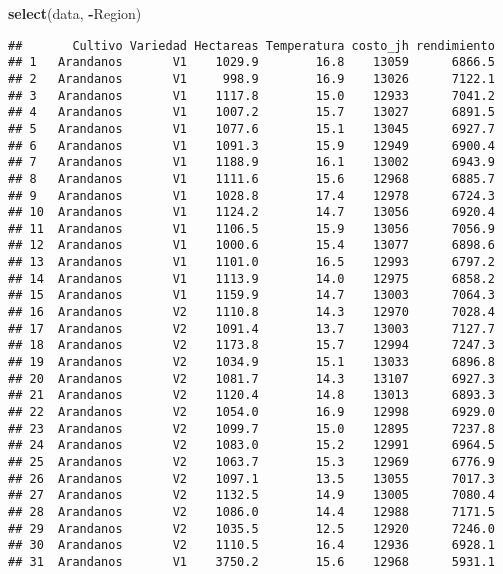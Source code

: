 \documentclass[]{book}
\newenvironment{Shaded}{\begin{snugshade}}{\end{snugshade}}
\newcommand{\KeywordTok}[1]{\textcolor[rgb]{0.13,0.29,0.53}{\textbf{#1}}}
\newcommand{\NormalTok}[1]{#1}
\newcommand{\OperatorTok}[1]{\textcolor[rgb]{0.81,0.36,0.00}{\textbf{#1}}}
\begin{document}
\begin{Shaded}
\begin{Highlighting}[]
\KeywordTok{select}\NormalTok{(data, }\OperatorTok{-}\NormalTok{Region)}
\end{Highlighting}
\end{Shaded}

\begin{verbatim}
##       Cultivo Variedad Hectareas Temperatura costo_jh rendimiento
## 1   Arandanos       V1    1029.9        16.8    13059      6866.5
## 2   Arandanos       V1     998.9        16.9    13026      7122.1
## 3   Arandanos       V1    1117.8        15.0    12933      7041.2
## 4   Arandanos       V1    1007.2        15.7    13027      6891.5
## 5   Arandanos       V1    1077.6        15.1    13045      6927.7
## 6   Arandanos       V1    1091.3        15.9    12949      6900.4
## 7   Arandanos       V1    1188.9        16.1    13002      6943.9
## 8   Arandanos       V1    1111.6        15.6    12968      6885.7
## 9   Arandanos       V1    1028.8        17.4    12978      6724.3
## 10  Arandanos       V1    1124.2        14.7    13056      6920.4
## 11  Arandanos       V1    1106.5        15.9    13056      7056.9
## 12  Arandanos       V1    1000.6        15.4    13077      6898.6
## 13  Arandanos       V1    1101.0        16.5    12993      6797.2
## 14  Arandanos       V1    1113.9        14.0    12975      6858.2
## 15  Arandanos       V1    1159.9        14.7    13003      7064.3
## 16  Arandanos       V2    1110.8        14.3    12970      7028.4
## 17  Arandanos       V2    1091.4        13.7    13003      7127.7
## 18  Arandanos       V2    1173.8        15.7    12994      7247.3
## 19  Arandanos       V2    1034.9        15.1    13033      6896.8
## 20  Arandanos       V2    1081.7        14.3    13107      6927.3
## 21  Arandanos       V2    1120.4        14.8    13013      6893.3
## 22  Arandanos       V2    1054.0        16.9    12998      6929.0
## 23  Arandanos       V2    1099.7        15.0    12895      7237.8
## 24  Arandanos       V2    1083.0        15.2    12991      6964.5
## 25  Arandanos       V2    1063.7        15.3    12969      6776.9
## 26  Arandanos       V2    1097.1        13.5    13055      7017.3
## 27  Arandanos       V2    1132.5        14.9    13005      7080.4
## 28  Arandanos       V2    1086.0        14.4    12988      7171.5
## 29  Arandanos       V2    1035.5        12.5    12920      7246.0
## 30  Arandanos       V2    1110.5        16.4    12936      6928.1
## 31  Arandanos       V1    3750.2        15.6    12968      5931.1

\end{verbatim}
\end{document}
